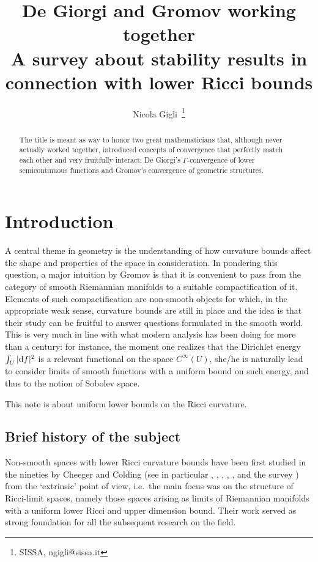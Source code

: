 \documentclass[11pt]{article}
\title{De Giorgi and Gromov working together \\[1ex] \large  A survey about stability results in connection with lower Ricci bounds}
\numberwithin{equation}{section}
\renewcommand{\d}{{\rm d}}
\begin{document}
	
	

\author{Nicola Gigli\ \thanks{SISSA, ngigli@sissa.it}  }




\maketitle	
	
\begin{abstract}
The title is meant as way to honor two great mathematicians that, although never actually worked together, introduced concepts of convergence that perfectly match each other and very fruitfully interact: De Giorgi's $\Gamma$-convergence of lower semicontinuous functions and Gromov's  convergence of geometric structures.


\end{abstract}	
	
	
	
\tableofcontents


\section{Introduction}
A central theme in geometry is the understanding of how curvature bounds affect the shape and properties of the space in consideration. In pondering this question, a major intuition by Gromov \cite{Gromov07} is that it is convenient to pass from the category of smooth Riemannian manifolds to a suitable compactification of it. Elements of such compactification are non-smooth objects for which, in the appropriate weak sense, curvature bounds are still in place and the idea is that their study can be fruitful  to answer questions formulated in the smooth world. This is very much in line with what modern analysis has been doing for more than a century: for instance, the moment one realizes that the Dirichlet energy $\int_U|\d f|^2$ is a relevant functional on the space $C^\infty(U)$, she/he is naturally lead to consider limits of smooth functions with a uniform bound on such energy, and thus to the notion of Sobolev space. 

\medskip

This note is about uniform lower bounds on the Ricci curvature. 


\subsection{Brief history of the subject}

Non-smooth spaces with lower Ricci curvature bounds have been first studied in the nineties by  Cheeger and Colding (see in particular \cite{Colding96b}, \cite{Colding97}, \cite{Cheeger-Colding96}, \cite{Cheeger-Colding97I}, \cite{Cheeger-Colding97II}, \cite{Cheeger-Colding97III} and the survey \cite{Cheegersurvey}) from the `extrinsic' point of view, i.e.\ the main focus was on the structure of Ricci-limit spaces, namely those spaces arising as limits of Riemannian manifolds with a uniform lower Ricci and upper dimension bound. Their work served as strong foundation for all the subsequent research on the field.
\end{document}
